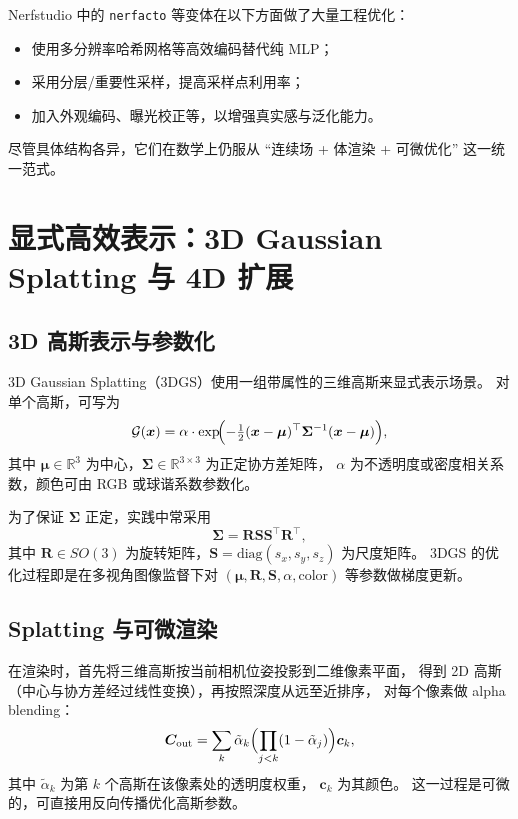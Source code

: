\documentclass[12pt]{ctexart}
\begin{document}
Nerfstudio 中的 \texttt{nerfacto} 等变体在以下方面做了大量工程优化：
\begin{itemize}
  \item 使用多分辨率哈希网格等高效编码替代纯 MLP；
  \item 采用分层/重要性采样，提高采样点利用率；
  \item 加入外观编码、曝光校正等，以增强真实感与泛化能力。
\end{itemize}

尽管具体结构各异，它们在数学上仍服从 ``连续场 + 体渲染 + 可微优化'' 这一统一范式。

\section{显式高效表示：3D Gaussian Splatting 与 4D 扩展}

\subsection{3D 高斯表示与参数化}

3D Gaussian Splatting（3DGS）使用一组带属性的三维高斯来显式表示场景。
对单个高斯，可写为
\begin{equation}
  \mathcal{G}(\bm{x})
  = \alpha \cdot \exp\!\Bigl(
      -\tfrac{1}{2}
      (\bm{x}-\bm{\mu})^\top
      \bm{\Sigma}^{-1}
      (\bm{x}-\bm{\mu})
    \Bigr),
\end{equation}
其中 $\bm{\mu}\in\mathbb{R}^3$ 为中心，$\bm{\Sigma}\in\mathbb{R}^{3\times 3}$ 为正定协方差矩阵，
$\alpha$ 为不透明度或密度相关系数，颜色可由 RGB 或球谐系数参数化。

为了保证 $\bm{\Sigma}$ 正定，实践中常采用
\begin{equation}
  \bm{\Sigma} = \bm{R}\bm{S}\bm{S}^\top \bm{R}^\top,
\end{equation}
其中 $\bm{R}\in SO(3)$ 为旋转矩阵，$\bm{S}=\mathrm{diag}(s_x,s_y,s_z)$ 为尺度矩阵。
3DGS 的优化过程即是在多视角图像监督下对
$(\bm{\mu},\bm{R},\bm{S},\alpha,\text{color})$ 等参数做梯度更新。

\subsection{Splatting 与可微渲染}

在渲染时，首先将三维高斯按当前相机位姿投影到二维像素平面，
得到 2D 高斯（中心与协方差经过线性变换），再按照深度从远至近排序，
对每个像素做 alpha blending：
\begin{equation}
  \bm{C}_\text{out} =
  \sum_{k}
    \tilde{\alpha}_k
    \Bigl(
      \prod_{j<k} (1-\tilde{\alpha}_j)
    \Bigr)
    \bm{c}_k,
\end{equation}
其中 $\tilde{\alpha}_k$ 为第 $k$ 个高斯在该像素处的透明度权重，
$\bm{c}_k$ 为其颜色。
这一过程是可微的，可直接用反向传播优化高斯参数。
\end{document}
